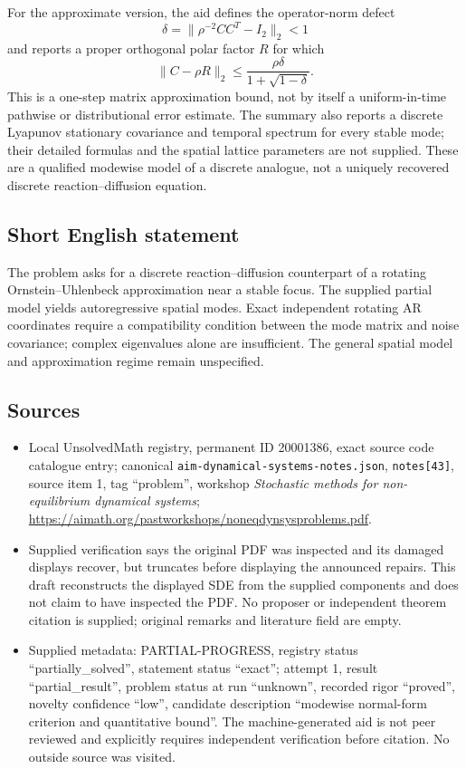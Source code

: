 \documentclass[11pt]{article}
\begin{document}
For the approximate version, the aid defines the operator-norm defect
\[
 \delta=\|\rho^{-2}CC^T-I_2\|_2<1
\]
and reports a proper orthogonal polar factor $R$ for which
\[
 \|C-\rho R\|_2\leq
 \frac{\rho\delta}{1+\sqrt{1-\delta}}.
\]
This is a one-step matrix approximation bound, not by itself a uniform-in-time pathwise or distributional error estimate. The summary also reports a discrete Lyapunov stationary covariance and temporal spectrum for every stable mode; their detailed formulas and the spatial lattice parameters are not supplied. These are a qualified modewise model of a discrete analogue, not a uniquely recovered discrete reaction--diffusion equation.
\subsection{Short English statement}
The problem asks for a discrete reaction--diffusion counterpart of a rotating Ornstein--Uhlenbeck approximation near a stable focus. The supplied partial model yields autoregressive spatial modes. Exact independent rotating AR coordinates require a compatibility condition between the mode matrix and noise covariance; complex eigenvalues alone are insufficient. The general spatial model and approximation regime remain unspecified.
\subsection{Sources}
\begin{itemize}
\item Local UnsolvedMath registry, permanent ID 20001386, exact source code catalogue entry; canonical \texttt{aim-dynamical-systems-notes.json}, \texttt{notes[43]}, source item 1, tag ``problem'', workshop \emph{Stochastic methods for non-equilibrium dynamical systems}; \url{https://aimath.org/pastworkshops/noneqdynsysproblems.pdf}.
\item Supplied verification says the original PDF was inspected and its damaged displays recover, but truncates before displaying the announced repairs. This draft reconstructs the displayed SDE from the supplied components and does not claim to have inspected the PDF. No proposer or independent theorem citation is supplied; original remarks and literature field are empty.
\item Supplied metadata: PARTIAL-PROGRESS, registry status ``partially\_solved'', statement status ``exact''; attempt 1, result ``partial\_result'', problem status at run ``unknown'', recorded rigor ``proved'', novelty confidence ``low'', candidate description ``modewise normal-form criterion and quantitative bound''. The machine-generated aid is not peer reviewed and explicitly requires independent verification before citation. No outside source was visited.
\end{itemize}
\end{document}
